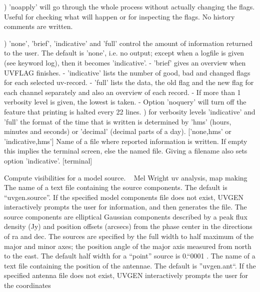 {) 'noapply' will go through the whole process without
actually changing the flags. Useful for checking what will
happen or for inspecting the flags.
No history comments are written.

) 'none', 'brief', 'indicative' and 'full' control the
amount of information returned to the user. The default is
'none', i.e. no output; except when a logfile is given (see
keyword log), then it becomes 'indicative'.
{\eightpoint\begintt
- 'brief' gives an overview when UVFLAG finishes.
- 'indicative' lists the number of good, bad and changed
   flags for each selected uv-record.
- 'full' lists the data, the old flag and the new flag for
  each channel separately and also an overview of each record.
- If more than 1 verbosity level is given, the lowest is taken.
- Option 'noquery' will turn off the feature that printing
  is halted every 22 lines.
\endtt}
) for verbosity levels 'indicative' and 'full' the format
of the time that is written is determined by 'hms' (hours,
minutes and seconds) or 'decimal' (decimal parts of a day).
['none,hms' or 'indicative,hms']
Name of a file where reported information is written.
If empty this implies the terminal screen, else the
named file. Giving a filename also sets option 'indicative'.
[terminal]
\par}
%
\noindent Compute visibilities for a model source.
\newline \ 
\newline {} Mel Wright
\newline {} uv analysis, map making
The name of a text file containing the source components. The
default is ``uvgen.source''. If the specified model components file
does not exist, UVGEN interactively prompts the user for information,
and then generates the file. The source components are elliptical
Gaussian components described by a peak flux density (Jy) and
position offsets (arcsecs) from the phase center in the directions
of ra and dec. The sources are specified by the full width to half
maximum of the major and minor axes; the position angle of the
major axis measured from north to the east. The default half width
for a ``point'' source is 0.``0001 .
The name of a text file containing the position of the antennae.
The default is ''uvgen.ant``. If the specified antenna file does
not exist, UVGEN interactively prompts the user for the coordinates
